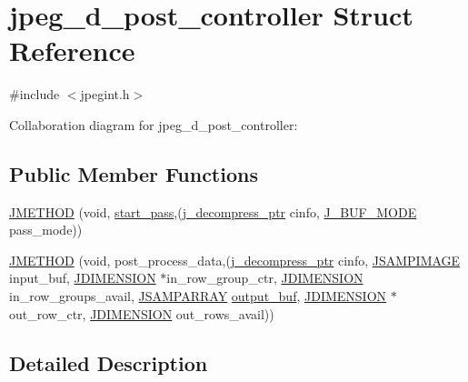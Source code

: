 \hypertarget{structjpeg__d__post__controller}{}\section{jpeg\+\_\+d\+\_\+post\+\_\+controller Struct Reference}
\label{structjpeg__d__post__controller}


{\ttfamily \#include $<$jpegint.\+h$>$}



Collaboration diagram for jpeg\+\_\+d\+\_\+post\+\_\+controller\+:
\subsection*{Public Member Functions}
\begin{DoxyCompactItemize}
\item 
\mbox{\hyperlink{structjpeg__d__post__controller_a349b2ff7508568d13a9294f3e79163aa}{J\+M\+E\+T\+H\+OD}} (void, \mbox{\hyperlink{jddctmgr_8c_a1964f006adb8fb80f57e455f6452aec1}{start\+\_\+pass}},(\mbox{\hyperlink{jpeglib_8h_a00c7d78af44bd26a901c791ccfc1e178}{j\+\_\+decompress\+\_\+ptr}} cinfo, \mbox{\hyperlink{jpegint_8h_a1f0803342372ac62b6903c399399c874}{J\+\_\+\+B\+U\+F\+\_\+\+M\+O\+DE}} pass\+\_\+mode))
\item 
\mbox{\hyperlink{structjpeg__d__post__controller_adb337adcfe3a314ceac4b626a73d87c3}{J\+M\+E\+T\+H\+OD}} (void, post\+\_\+process\+\_\+data,(\mbox{\hyperlink{jpeglib_8h_a00c7d78af44bd26a901c791ccfc1e178}{j\+\_\+decompress\+\_\+ptr}} cinfo, \mbox{\hyperlink{jpeglib_8h_a4bf858e4d42202287e786bdec2f3b62b}{J\+S\+A\+M\+P\+I\+M\+A\+GE}} input\+\_\+buf, \mbox{\hyperlink{jmorecfg_8h_a04ed4674f6f1d0d50ec241531e38274f}{J\+D\+I\+M\+E\+N\+S\+I\+ON}} $\ast$in\+\_\+row\+\_\+group\+\_\+ctr, \mbox{\hyperlink{jmorecfg_8h_a04ed4674f6f1d0d50ec241531e38274f}{J\+D\+I\+M\+E\+N\+S\+I\+ON}} in\+\_\+row\+\_\+groups\+\_\+avail, \mbox{\hyperlink{jpeglib_8h_ac9d5d1b829ed51769db69a37271a7e91}{J\+S\+A\+M\+P\+A\+R\+R\+AY}} \mbox{\hyperlink{jdct_8h_ad7e4660a191b1a791748dd44d5a7a0ec}{output\+\_\+buf}}, \mbox{\hyperlink{jmorecfg_8h_a04ed4674f6f1d0d50ec241531e38274f}{J\+D\+I\+M\+E\+N\+S\+I\+ON}} $\ast$out\+\_\+row\+\_\+ctr, \mbox{\hyperlink{jmorecfg_8h_a04ed4674f6f1d0d50ec241531e38274f}{J\+D\+I\+M\+E\+N\+S\+I\+ON}} out\+\_\+rows\+\_\+avail))
\end{DoxyCompactItemize}


\subsection{Detailed Description}


